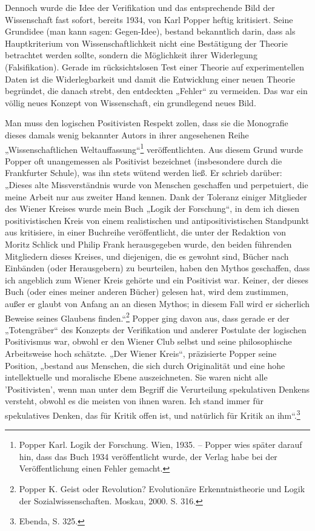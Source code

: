 \documentclass[11pt,a4paper]{article}
\begin{document}
Dennoch wurde die Idee der Verifikation und das entsprechende Bild der
Wissenschaft fast sofort, bereits 1934, von Karl Popper heftig kritisiert.
Seine Grundidee (man kann sagen: Gegen-Idee), bestand bekanntlich darin, dass
als Hauptkriterium von Wissenschaftlichkeit nicht eine Bestätigung der Theorie
betrachtet werden sollte, sondern die Möglichkeit ihrer Widerlegung
(Falsifikation).  Gerade im rücksichtslosen Test einer Theorie auf
experimentellen Daten ist die Widerlegbarkeit und damit die Entwicklung einer
neuen Theorie begründet, die danach strebt, den entdeckten „Fehler“ zu
vermeiden. Das war ein völlig neues Konzept von Wissenschaft, ein grundlegend
neues Bild.

Man muss den logischen Positivisten Respekt zollen, dass sie die Monografie
dieses damals wenig bekannter Autors in ihrer angesehenen Reihe
„Wissenschaftlichen Weltauffassung“\footnote{Popper Karl. Logik der
  Forschung. Wien, 1935. -- Popper wies später darauf hin, dass das Buch 1934
  veröffentlicht wurde, der Verlag habe bei der Veröffentlichung einen Fehler
  gemacht.} veröffentlichten. Aus diesem Grund wurde Popper oft unangemessen
als Positivist bezeichnet (insbesondere durch die Frankfurter Schule), was ihn
stets wütend werden ließ. Er schrieb darüber: „Dieses alte Missverständnis
wurde von Menschen geschaffen und perpetuiert, die meine Arbeit nur aus
zweiter Hand kennen. Dank der Toleranz einiger Mitglieder des Wiener Kreises
wurde mein Buch „Logik der Forschung“, in dem ich diesen positivistischen
Kreis von einem realistischen und antipositivistischen Standpunkt aus
kritisiere, in einer Buchreihe veröffentlicht, die unter der Redaktion von
Moritz Schlick und Philip Frank herausgegeben wurde, den beiden führenden
Mitgliedern dieses Kreises, und diejenigen, die es gewohnt sind, Bücher nach
Einbänden (oder Herausgebern) zu beurteilen, haben den Mythos geschaffen, dass
ich angeblich zum Wiener Kreis gehörte und ein Positivist war.  Keiner, der
dieses Buch (oder eines meiner anderen Bücher) gelesen hat, wird dem
zustimmen, außer er glaubt von Anfang an an diesen Mythos; in diesem Fall wird
er sicherlich Beweise seines Glaubens finden.“\footnote{Popper K. Geist oder
  Revolution? Evolutionäre Erkenntnistheorie und Logik der
  Sozialwissenschaften.  Moskau, 2000. S. 316.} Popper ging davon aus, dass
gerade er der „Totengräber“ des Konzepts der Verifikation und anderer
Postulate der logischen Positivismus war, obwohl er den Wiener Club selbst und
seine philosophische Arbeitsweise hoch schätzte. „Der Wiener Kreis“,
präzisierte Popper seine Position, „bestand aus Menschen, die sich durch
Originalität und eine hohe intellektuelle und moralische Ebene auszeichneten.
Sie waren nicht alle 'Positivisten', wenn man unter dem Begriff die
Verurteilung spekulativen Denkens versteht, obwohl es die meisten von ihnen
waren.  Ich stand immer für spekulatives Denken, das für Kritik offen ist, und
natürlich für Kritik an ihm“.\footnote{Ebenda, S. 325.}
\end{document}
